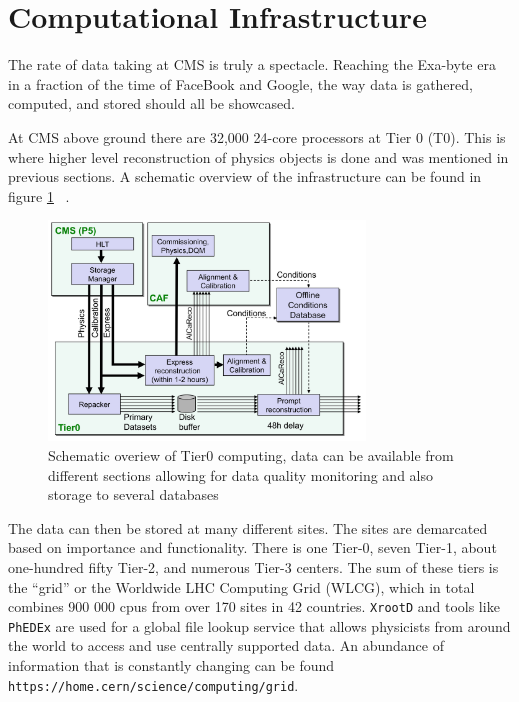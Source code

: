 \section{Computational Infrastructure}
The rate of data taking at CMS is truly a spectacle. Reaching the Exa-byte era in a fraction of the time of FaceBook and Google, the way data is gathered, computed, and stored should all be showcased. 

At CMS above ground there are 32,000 24-core processors at Tier 0 (T0). This is where higher level reconstruction of physics objects is done and was mentioned in previous sections. A schematic overview of the infrastructure can be found in figure \ref{fig:t0} ~\cite{Hufnagel:1319049}. 

\begin{figure}[ht!b]
  \centering
\includegraphics[width=0.75\textwidth]{figures/Tier0.png}    
    \caption{\label{fig:t0} Schematic overiew of Tier0 computing, data can be available from different sections allowing for data quality monitoring and also storage to several databases ~\cite{Hufnagel:1319049} }
\end{figure}

The data can then be stored at many different sites. The sites are demarcated based on importance and functionality. There is one Tier-0, seven Tier-1, about one-hundred fifty Tier-2, and numerous Tier-3 centers. The sum of these tiers is the ``grid'' or the Worldwide LHC Computing Grid (WLCG), which in total combines 900 000 cpus from over 170 sites in 42 countries. \texttt{XrootD} and tools like \texttt{PhEDEx} are used for a global file lookup service that allows physicists from around the world to access and use centrally supported data. An abundance of information that is constantly changing can be found \texttt{https://home.cern/science/computing/grid}. 



